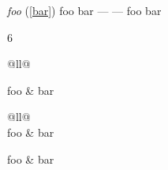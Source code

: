 \emph{foo} (\autoref{bar})
\textbar{} foo \textbar{} bar \textbar{}
\textbar{} --- \textbar{} --- \textbar{}
\textbar{} foo \textbar{} bar \textbar{}

6

\begin{table}[htbp]
\begin{minipage}{\linewidth}
\setlength{\tymax}{0.5\linewidth}
\centering
\small
\caption{\emph{caption}}
\label{bar}
\begin{tabulary}{\textwidth}{@{}ll@{}} \toprule
\midrule

 foo & bar \\
\bottomrule

\end{tabulary}
\end{minipage}
\end{table}

\begin{table}[htbp]
\begin{minipage}{\linewidth}
\setlength{\tymax}{0.5\linewidth}
\centering
\small
\begin{tabulary}{\textwidth}{@{}ll@{}} \toprule
{}\\
 foo & bar \\
\midrule

 foo & bar \\
\bottomrule

\end{tabulary}
\end{minipage}
\end{table}



